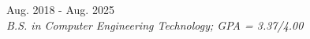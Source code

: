 
	\hfill Aug. 2018 - Aug. 2025\\
\textit{B.S. in Computer Engineering Technology; GPA = 3.37/4.00}

